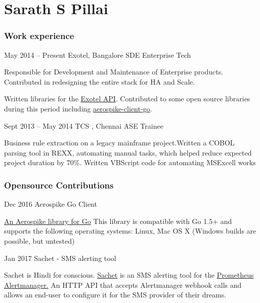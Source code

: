 \documentclass{tccv}
\begin{document}
\part{Sarath S Pillai}

\section{Work experience}

\begin{eventlist}

\item{May 2014 -- Present}
     {Exotel, Bangalore}
     {SDE Enterprise Tech}
     
Responsible for Development and Maintenance of Enterprise products. 
Contributed in redesigning the entire stack for HA and Scale.

Written libraries for the \href{https://pypi.python.org/pypi/exotel}{Exotel API}.
Contributed to some open source libraries during this period including  \href{https://github.com/aerospike/aerospike-client-go}{aerospike-client-go}.


\item{Sept 2013 -- May 2014}
     {TCS , Chennai}
     {ASE Trainee}

Business rule extraction on a legacy mainframe project.Written a COBOL parsing tool in REXX, automating manual tasks, which helped reduce expected project duration by 70\%. Written VBScript 
code for automating MSExcell  works

\end{eventlist}


\section{Opensource Contributions}

\begin{eventlist}
\item{Dec 2016}{ }
     {Aerospike Go Client}
     
\href{https://github.com/aerospike/aerospike-client-go}{An Aerospike library for Go}
This library is compatible with Go 1.5+ and supports the following operating systems: Linux, Mac OS X (Windows builds are possible, but untested) 

\item{Jan 2017}{  }
     {Sachet - SMS alerting tool}
     
Sachet is Hindi for conscious.
\href{https://github.com/messagebird/sachet}{Sachet} is an SMS alerting tool for the
\href{https://github.com/prometheus/alertmanager}{Prometheus Alertmanager.}
An HTTP API that accepts Alertmanager webhook calls and allows an end-user to configure it for the SMS provider of their dreams.
\end{eventlist}
\end{document}
